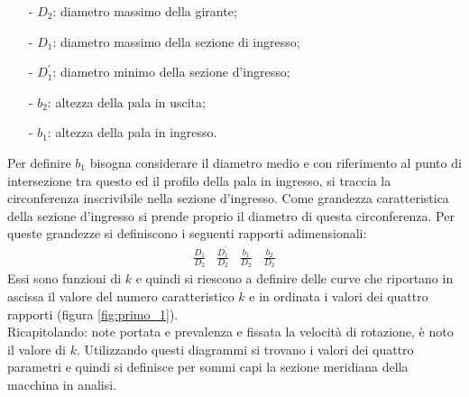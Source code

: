 \begin{itemize}
\item[-]$D_2$: diametro massimo della girante;\\
\item[-]$D_1$: diametro massimo della sezione di ingresso;\\
\item[-]$D_1^{'}$: diametro minimo della sezione d'ingresso;\\
\item[-]$b_2$: altezza della pala in uscita;\\
\item[-]$b_1$: altezza della pala in ingresso.
\end{itemize}
Per definire $b_1$ bisogna considerare il diametro medio e con riferimento al punto di intersezione tra questo ed il profilo della pala in ingresso, si traccia la circonferenza inscrivibile nella sezione d’ingresso. Come grandezza caratteristica della sezione d’ingresso si prende proprio il diametro di questa circonferenza. Per queste grandezze si definiscono i seguenti rapporti adimensionali:
\begin{align*}
\frac{D_1}{D_2} \;\;\; \frac{D_1^{'}}{D_2} \;\;\; \frac{b_1}{D_2} \;\;\; \frac{b_2}{D_2} 
\end{align*}
Essi sono funzioni di $k$ e quindi si riescono a definire delle curve che riportano in ascissa il valore del numero caratteristico $k$ e in ordinata i valori dei quattro rapporti (figura \ref{fig:primo_1}).\\
Ricapitolando: note portata e prevalenza e fissata la velocità di rotazione, è noto il valore di $k$. Utilizzando questi diagrammi si trovano i valori dei quattro parametri e quindi si definisce per sommi capi la sezione meridiana della macchina in analisi.

